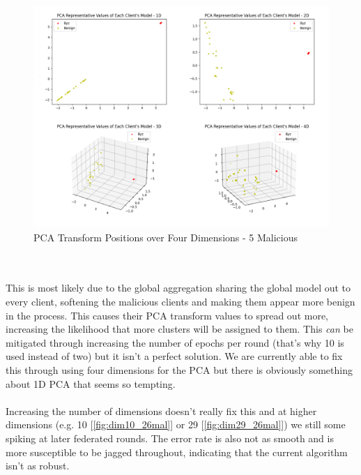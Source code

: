 \begin{figure}[htbp]
	\centering
    \includegraphics[scale=0.33]{my_agg/graphs/5mal_dims.png}
	\caption{PCA Transform Positions over Four Dimensions - 5 Malicious}
	\label{fig:5mal_dims}
\end{figure}
\\ \\
This is most likely due to the global aggregation sharing the global model out to every client, softening the malicious clients and making them appear more benign in the process.
This causes their PCA transform values to spread out more, increasing the likelihood that more clusters will be assigned to them.
This \textit{can} be mitigated through increasing the number of epochs per round (that's why 10 is used instead of two) but it isn't a perfect solution.
We are currently able to fix this through using four dimensions for the PCA but there is obviously something about 1D PCA that seems so tempting.
\\ \\
Increasing the number of dimensions doesn't really fix this and at higher dimensions (e.g. 10 [\ref{fig:dim10_26mal}] or 29 [\ref{fig:dim29_26mal}]) we still some spiking at later federated rounds.
The error rate is also not as smooth and is more susceptible to be jagged throughout, indicating that the current algorithm isn't as robust.



